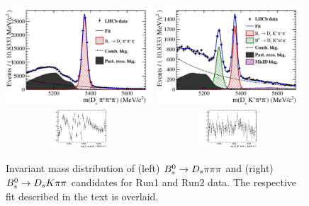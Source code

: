 \begin{figure}[h]
\includegraphics[height=7.cm,width=0.49\textwidth]{figs/norm.pdf}
\includegraphics[height=7.cm,width=0.49\textwidth]{figs/signal.pdf}\\
\includegraphics[width=0.49\textwidth,height=1.5cm]{figs/norm_pull.pdf}
\includegraphics[width=0.49\textwidth,height=1.5cm]{figs/signal_pull.pdf}
\caption{Invariant mass distribution of (left) ${{B}^0_{s}}\rightarrow{\ensuremath{{D}_{s}}}{\ensuremath{\pi}}{\ensuremath{\pi}}{\ensuremath{\pi}}$ and (right) ${{B}^0_{s}}\rightarrow{\ensuremath{{D}_{s}}}{\ensuremath{K}}{\ensuremath{\pi}}{\ensuremath{\pi}}$ candidates for Run1 and Run2 data.
The respective fit described in the text is overlaid.}
\label{fig: BsDsKpipiFit}
\end{figure}


